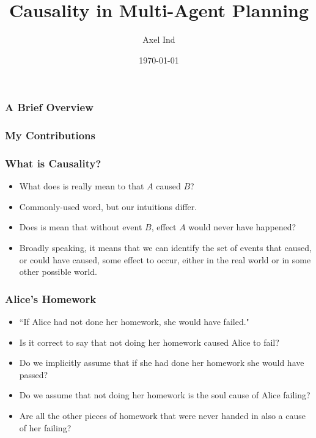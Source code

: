 \documentclass{beamer}
\title{Causality in Multi-Agent Planning}
\author{Axel Ind}
\institute{ALU-Freiburg}
\date{\today}
\theoremstyle{plain}
\theoremstyle{definition}
\begin{document}
 
\frame{\titlepage}

\begin{frame}
\frametitle{A Brief Overview}

\end{frame}


\begin{frame}
\frametitle{My Contributions}

\end{frame}


 
\begin{frame}
\frametitle{What is Causality?}
\begin{itemize}
\item What does is really mean to that $A$ caused $B$?
\item Commonly-used word, but our intuitions differ.
\item Does is mean that without event $B$, effect $A$ would never have happened?
\item Broadly speaking, it means that we can identify the set of events that caused, or could have caused, some effect to occur, either in the real world or in some other possible world.

\end{itemize}

\end{frame}

\begin{frame}
\frametitle{Alice's Homework}
\begin{itemize}
\item ``If Alice had not done her homework, she would have failed."
\item Is it correct to say that not doing her homework caused Alice to fail?
\item Do we implicitly assume that if she had done her homework she would have passed?
\item Do we assume that not doing her homework is the soul cause of Alice failing?
\item Are all the other pieces of homework that were never handed in also a cause of her failing?
\end{itemize}

\end{frame}
\end{document}
